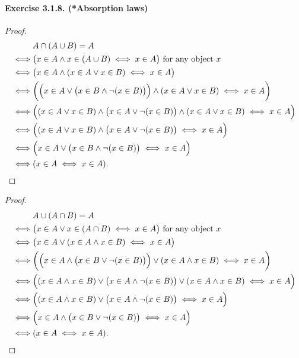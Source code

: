\paragraph{Exercise 3.1.8. (*Absorption laws)}
\begin{proof}
    \begin{align*}
        & A \cap (A \cup B) = A
        \\\iff& \big( x \in A \land x \in (A \cup B) \iff x \in A \big) \text{ for any object $x$}
        \\\iff& \big( x \in A \land (x \in A \lor x \in B) \iff x \in A \big)
        \\\iff& \bigg( \Big(x \in A \lor \big(x\in B \land \lnot (x \in B) \big) \Big) \land (x \in A \lor x \in B) \iff x \in A \bigg)
        \\\iff& \Big( (x\in A \lor x \in B) \land \big( x\in A \lor \lnot(x \in B) \big) \land (x\in A \lor x \in B) \iff x \in A \Big)
        \\\iff& \Big( (x\in A \lor x \in B) \land \big( x\in A \lor \lnot(x \in B) \big) \iff x \in A \Big)
        \\\iff& \Big( x\in A \lor \big(x\in B \land \lnot(x\in B) \big) \iff x \in A \Big)
        \\\iff& ( x\in A \iff x \in A ). \qedhere
    \end{align*}
\end{proof}
\begin{proof}
    \begin{align*}
        & A \cup (A \cap B) = A
        \\\iff& \big( x \in A \lor x \in (A \cap B) \iff x \in A \big) \text{ for any object $x$}
        \\\iff& \big( x \in A \lor (x \in A \land x \in B) \iff x \in A \big)
        \\\iff& \bigg( \Big(x \in A \land \big(x\in B \lor \lnot (x \in B) \big) \Big) \lor (x \in A \land x \in B) \iff x \in A \bigg)
        \\\iff& \Big( (x\in A \land x \in B) \lor \big( x\in A \land \lnot(x \in B) \big) \lor (x\in A \land x \in B) \iff x \in A \Big)
        \\\iff& \Big( (x\in A \land x \in B) \lor \big( x\in A \land \lnot(x \in B) \big) \iff x \in A \Big)
        \\\iff& \Big( x\in A \land \big(x\in B \lor \lnot(x\in B) \big) \iff x \in A \Big)
        \\\iff& ( x\in A \iff x \in A ). \qedhere
    \end{align*}
\end{proof}

